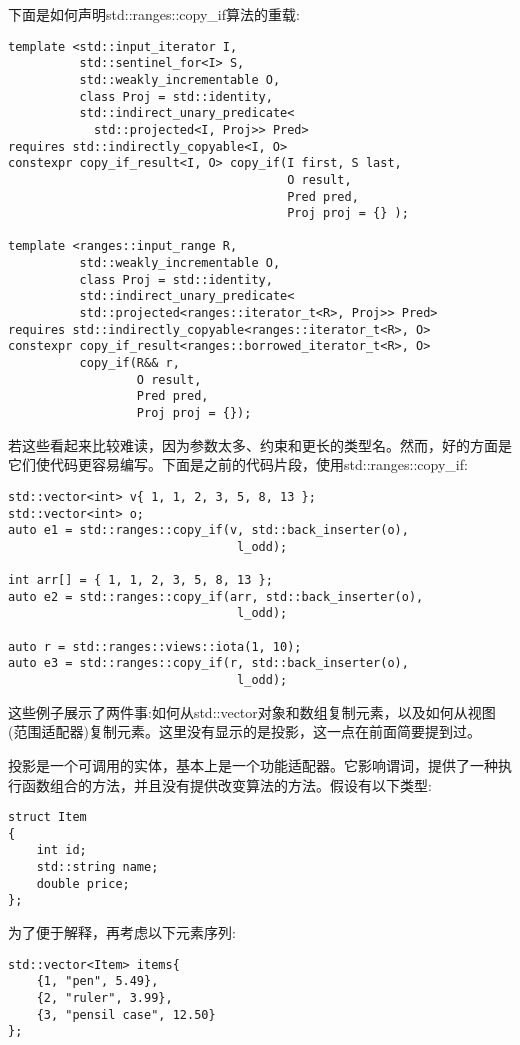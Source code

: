 下面是如何声明std::ranges::copy\_if算法的重载:

\begin{lstlisting}[style=styleCXX]
template <std::input_iterator I,
		  std::sentinel_for<I> S,
		  std::weakly_incrementable O,
		  class Proj = std::identity,
		  std::indirect_unary_predicate<
		    std::projected<I, Proj>> Pred>
requires std::indirectly_copyable<I, O>
constexpr copy_if_result<I, O> copy_if(I first, S last,
									   O result,
								   	   Pred pred,
									   Proj proj = {} );
									   
template <ranges::input_range R,
		  std::weakly_incrementable O,
		  class Proj = std::identity,
		  std::indirect_unary_predicate<
		  std::projected<ranges::iterator_t<R>, Proj>> Pred>
requires std::indirectly_copyable<ranges::iterator_t<R>, O>
constexpr copy_if_result<ranges::borrowed_iterator_t<R>, O>
		  copy_if(R&& r,
				  O result,
				  Pred pred,
				  Proj proj = {});
\end{lstlisting}

若这些看起来比较难读，因为参数太多、约束和更长的类型名。然而，好的方面是它们使代码更容易编写。下面是之前的代码片段，使用std::ranges::copy\_if:

\begin{lstlisting}[style=styleCXX]
std::vector<int> v{ 1, 1, 2, 3, 5, 8, 13 };
std::vector<int> o;
auto e1 = std::ranges::copy_if(v, std::back_inserter(o),
								l_odd);
								
int arr[] = { 1, 1, 2, 3, 5, 8, 13 };
auto e2 = std::ranges::copy_if(arr, std::back_inserter(o),
								l_odd);

auto r = std::ranges::views::iota(1, 10);
auto e3 = std::ranges::copy_if(r, std::back_inserter(o),
								l_odd);
\end{lstlisting}

这些例子展示了两件事:如何从std::vector对象和数组复制元素，以及如何从视图(范围适配器)复制元素。这里没有显示的是投影，这一点在前面简要提到过。

投影是一个可调用的实体，基本上是一个功能适配器。它影响谓词，提供了一种执行函数组合的方法，并且没有提供改变算法的方法。假设有以下类型:

\begin{lstlisting}[style=styleCXX]
struct Item
{
	int id;
	std::string name;
	double price;
};
\end{lstlisting}

为了便于解释，再考虑以下元素序列:

\begin{lstlisting}[style=styleCXX]
std::vector<Item> items{
	{1, "pen", 5.49},
	{2, "ruler", 3.99},
	{3, "pensil case", 12.50}
};
\end{lstlisting}

